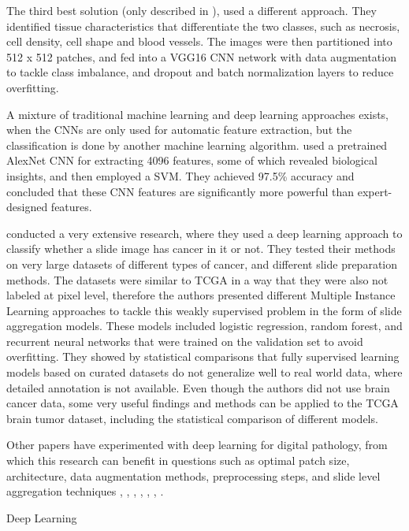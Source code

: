 The third best solution (only described in \cite{Kurc2020}), used a different approach. They identified tissue characteristics that differentiate the two classes, such as necrosis, cell density, cell shape and blood vessels. The images were then partitioned into 512 x 512 patches, and fed into a VGG16 CNN network with data augmentation to tackle class imbalance, and dropout and batch normalization layers to reduce overfitting.

A mixture of traditional machine learning and deep learning approaches exists, when the CNNs are only used for automatic feature extraction, but the classification is done by another machine learning algorithm. \cite{xu2017} used a pretrained AlexNet CNN for extracting 4096 features, some of which revealed biological insights, and then employed a SVM. They achieved 97.5\% accuracy and concluded that these CNN features are significantly more powerful than expert-designed features.

\cite{campanella2019} conducted a very extensive research, where they used a deep learning approach to classify whether a slide image has cancer in it or not. They tested their methods on very large datasets of different types of cancer, and different slide preparation methods. The datasets were similar to TCGA in a way that they were also not labeled at pixel level, therefore the authors presented different Multiple Instance Learning approaches to tackle this weakly supervised problem in the form of slide aggregation models. These models included logistic regression, random forest, and recurrent neural networks that were trained on the validation set to avoid overfitting. They showed by statistical comparisons that fully supervised learning models based on curated datasets do not generalize well to real world data, where detailed annotation is not available. Even though the authors did not use brain cancer data, some very useful findings and methods can be applied to the TCGA brain tumor dataset, including the statistical comparison of different models.

Other papers have experimented with deep learning for digital pathology, from which this research can benefit in questions such as optimal patch size, architecture, data augmentation methods, preprocessing steps, and slide level aggregation techniques \cite{janowczyk2016}, \cite{ertosun2015}, \cite{shirazi2020}, \cite{Hamidinekoo2020}, \cite{ker2019}, \cite{wang2019}, \cite{hou2016}.

Deep Learning

